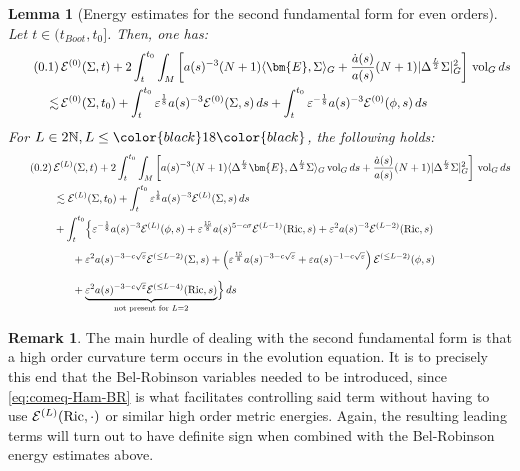 \documentclass[11pt,leqno,textwidth=10cm]{amsart}
\numberwithin{equation}{section}
\theoremstyle{definition}
\newtheorem{remark}[definition]{Remark}
\theoremstyle{plain}
\newtheorem{lemma}[definition]{Lemma}
\newcommand{\1}{\mathbbm{1}}
\newcommand{\E}{\mathcal{E}}
\newcommand{\N}{\mathbb{N}}
\newcommand{\Ric}{\text{\normalfont{Ric}}}
\newcommand{\vol}[1]{{\text{\normalfont{vol}}}_{#1}}
\renewcommand{\epsilon}{\varepsilon}
\newcommand{\Lap}{\Delta}
\newcommand{\numberthis}{\addtocounter{equation}{1}\tag{\theequation}}
\renewcommand{\theequation}{\arabic{section}.\arabic{equation}}
\newcommand{\RE}{\bm{E}}
\newcommand{\change}[1]{\color{black}#1\color{black}}
\begin{document}
\begin{lemma}[Energy estimates for the second fundamental form \change{for even orders}]\label{lem:en-est-Sigma} Let $t\in(t_{Boot},t_0]$. Then, one has:
\begin{align*}
\numberthis\label{eq:en-est-Sigma0}&\,\E^{(0)}(\Sigma,t)+2\int_t^{t_0}\int_M\left[a(s)^{-3}(N+1)\langle\RE,\Sigma\rangle_G+\frac{\dot{a}(s)}{a(s)}(N+1)\lvert\Lap^{\frac{L}2}\Sigma\rvert_G^2\right]\,\vol{G}\,ds\\
\lesssim&\,\E^{(0)}(\Sigma,t_0)+\int_t^{t_0}\epsilon^\frac18a(s)^{-3}\E^{(0)}(\Sigma,s)\,ds+\int_t^{t_0}\epsilon^{-\frac18}a(s)^{-3}\E^{(0)}(\phi,s)\,ds\\
\end{align*}
For $L\in 2\N, L\leq \change{18}$, the following holds:
\begin{align*}
\numberthis\label{eq:en-est-Sigma}&\,\E^{(L)}(\Sigma,t)+2\int_t^{t_0}\int_M\left[a(s)^{-3}(N+1)\langle\Lap^\frac{L}2\RE,\Lap^{\frac{L}2}\Sigma\rangle_G\,\vol{G}\,ds+\frac{\dot{a}(s)}{a(s)}(N+1)\lvert\Lap^{\frac{L}2}\Sigma\rvert_G^2\right]\,\vol{G}\,ds\\
&\,\lesssim\E^{(L)}(\Sigma,t_0)+\int_t^{t_0}\epsilon^\frac18a(s)^{-3}\E^{(L)}(\Sigma,s)\,ds\\
&\,+\int_t^{t_0}\Bigr\{\epsilon^{-\frac18}a(s)^{-3}\E^{(L)}(\phi,s)+\epsilon^\frac{15}8a(s)^{5-c\sigma}\E^{(L-1)}(\Ric,s)+\epsilon^2a(s)^{-3}\E^{(L-2)}(\Ric,s)\\
&\,\phantom{\int_t^{t_0}}+\epsilon^2a(s)^{-3-c\sqrt{\epsilon}}\E^{(\leq L-2)}(\Sigma,s)+\left(\epsilon^\frac{15}8a(s)^{-3-c\sqrt{\epsilon}}+\epsilon a(s)^{-1-c\sqrt{\epsilon}}\right)\E^{(\leq L-2)}(\phi,s)\\
&\,\phantom{\int_t^{t_0}}+\underbrace{\epsilon^2a(s)^{-3-c\sqrt{\epsilon}}\E^{(\leq L-4)}(\Ric,s)}_{\text{not present for }L=2}\Bigr\}\,ds
\end{align*}
\end{lemma}
\begin{remark}
The main hurdle of dealing with the second fundamental form is that a high order curvature term occurs in the evolution equation. It is to precisely this end that the Bel-Robinson variables needed to be introduced, since \eqref{eq:comeq-Ham-BR} is what facilitates controlling said term without having to use $\E^{(L)}(\Ric,\cdot)$ or similar high order metric energies. Again, the resulting leading terms will turn out to have definite sign when combined with the Bel-Robinson energy estimates above.
\end{remark}
\end{document}
